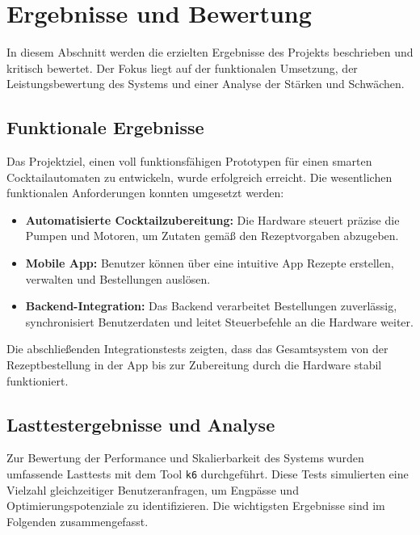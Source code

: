\section{Ergebnisse und Bewertung}

In diesem Abschnitt werden die erzielten Ergebnisse des Projekts beschrieben und kritisch bewertet. Der Fokus liegt auf der funktionalen Umsetzung, der Leistungsbewertung des Systems und einer Analyse der Stärken und Schwächen.

\subsection{Funktionale Ergebnisse}

Das Projektziel, einen voll funktionsfähigen Prototypen für einen smarten Cocktailautomaten zu entwickeln, wurde erfolgreich erreicht. Die wesentlichen funktionalen Anforderungen konnten umgesetzt werden:

\begin{itemize}
  \item \textbf{Automatisierte Cocktailzubereitung:} Die Hardware steuert präzise die Pumpen und Motoren, um Zutaten gemäß den Rezeptvorgaben abzugeben.
  \item \textbf{Mobile App:} Benutzer können über eine intuitive App Rezepte erstellen, verwalten und Bestellungen auslösen.
  \item \textbf{Backend-Integration:} Das Backend verarbeitet Bestellungen zuverlässig, synchronisiert Benutzerdaten und leitet Steuerbefehle an die Hardware weiter.
\end{itemize}

Die abschließenden Integrationstests zeigten, dass das Gesamtsystem von der Rezeptbestellung in der App bis zur Zubereitung durch die Hardware stabil funktioniert.

\subsection{Lasttestergebnisse und Analyse}

Zur Bewertung der Performance und Skalierbarkeit des Systems wurden umfassende Lasttests mit dem Tool \texttt{k6} durchgeführt. Diese Tests simulierten eine Vielzahl gleichzeitiger Benutzeranfragen, um Engpässe und Optimierungspotenziale zu identifizieren. Die wichtigsten Ergebnisse sind im Folgenden zusammengefasst.

